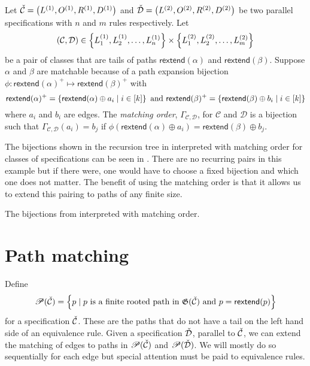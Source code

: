 \begin{definition}
Let $\check{\mathcal{C}} = \left(L^{(1)}, O^{(1)}, R^{(1)}, D^{(1)}\right)$ and $\check{\mathcal{D}} = \left(L^{(2)}, O^{(2)}, R^{(2)}, D^{(2)}\right)$ be two parallel specifications with $n$ and $m$ rules respectively. Let
\[
    \left(\mathcal{C},\mathcal{D}\right) \in \left\{L^{(1)}_1,L^{(1)}_2,\dotsc,L^{(1)}_n\right\} \times \left\{L^{(2)}_1, L^{(2)}_2, \dotsc, L^{(2)}_m\right\}
\]
be a pair of classes that are tails of paths $\textsf{rextend}(\alpha)$ and $\textsf{rextend}(\beta)$. Suppose $\alpha$ and $\beta$ are matchable because of a path expansion bijection $\phi: \textsf{rextend}(\alpha)^+ \mapsto \textsf{rextend}(\beta)^+$ with
\[
    \textsf{rextend}(\alpha)^+ = \left\{\textsf{rextend}(\alpha) \oplus a_i \mid i \in [k]\right\} \text{ and } \textsf{rextend}(\beta)^+ = \left\{\textsf{rextend}(\beta) \oplus b_i \mid i \in [k]\right\}
\]
where $a_i$ and $b_i$ are edges. The \emph{matching order}, $\Gamma_{\mathcal{C},\mathcal{D}}$, for $\mathcal{C}$ and $\mathcal{D}$ is a bijection such that $\Gamma_{\mathcal{C},\mathcal{D}}(a_i) = b_j$ if $\phi(\textsf{rextend}(\alpha) \oplus a_i) = \textsf{rextend}(\beta) \oplus b_j$.
\end{definition}

 The bijections shown in the recursion tree in  interpreted with matching order for classes of specifications can be seen in . There are no recurring pairs in this example but if there were, one would have to choose a fixed bijection and which one does not matter. The benefit of using the matching order is that it allows us to extend this pairing to paths of any finite size.

\begin{table}[ht!]
    \centering
    
    \caption{The bijections from  interpreted with matching order.}
    \label{tab:corrmatch}
\end{table}

\section{Path matching}
Define
\[
    \mathscr{P}(\check{\mathcal{C}}) = \left\{p \mid p \text{ is a finite rooted path in } \mathfrak{G}(\check{\mathcal{C}}) \text{ and }p = \textsf{rextend}(p)\right\}
\]
for a specification $\check{\mathcal{C}}$. These are the paths that do not have a tail on the left hand side of an equivalence rule. Given a specification $\check{\mathcal{D}}$, parallel to $\check{\mathcal{C}}$, we can extend the matching of edges to paths in $\mathscr{P}(\check{\mathcal{C}})$ and $\mathscr{P}(\check{\mathcal{D}})$. We will mostly do so sequentially for each edge but special attention must be paid to equivalence rules.

